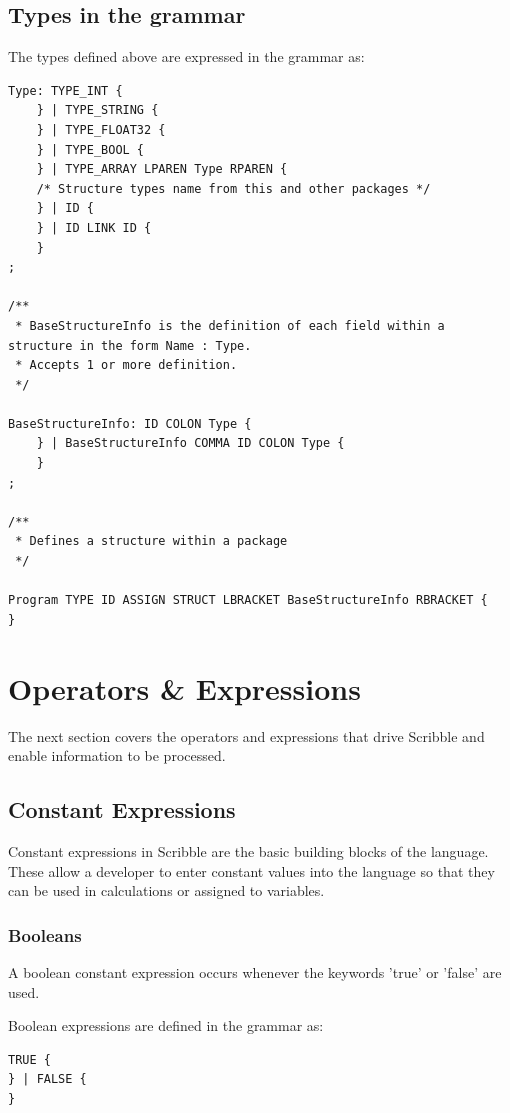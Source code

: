 \documentclass[]{final_report}
\begin{document}
\subsection{Types in the grammar}

The types defined above are expressed in the grammar as:
\begin{verbatim}
Type: TYPE_INT {
	} | TYPE_STRING {
	} | TYPE_FLOAT32 {
	} | TYPE_BOOL {
	} | TYPE_ARRAY LPAREN Type RPAREN {
	/* Structure types name from this and other packages */	
	} | ID {
	} | ID LINK ID {
	}
;

/**
 * BaseStructureInfo is the definition of each field within a structure in the form Name : Type.
 * Accepts 1 or more definition.
 */

BaseStructureInfo: ID COLON Type {		
	} | BaseStructureInfo COMMA ID COLON Type {
	}
;

/**
 * Defines a structure within a package
 */
 
Program TYPE ID ASSIGN STRUCT LBRACKET BaseStructureInfo RBRACKET {
}

\end{verbatim}

\section{Operators \& Expressions}

The next section covers the operators and expressions that drive Scribble and enable information to be processed.

\subsection{Constant Expressions}

Constant expressions in Scribble are the basic building blocks of the language. These allow a developer to enter constant values into the language so that they can be used in calculations or assigned to variables.

\subsubsection{Booleans}

A boolean constant expression occurs whenever the keywords 'true' or 'false' are used.

Boolean expressions are defined in the grammar as:
\begin{verbatim}
TRUE {
} | FALSE {
}\end{verbatim}
\end{document}
